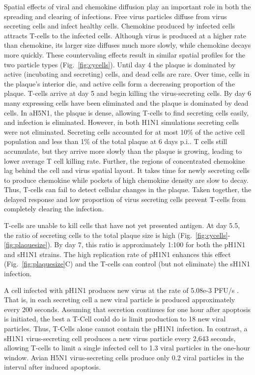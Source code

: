 \documentclass[10pt]{article}
\begin{document}
Spatial effects of viral and chemokine diffusion play an important role in both the spreading and clearing of infections.  Free virus particles diffuse from virus secreting cells and infect healthy cells.  Chemokine produced by infected cells attracts T-cells to the infected cells.  Although virus is produced at a higher rate than chemokine, its larger size diffuses much more slowly, while chemokine decays more quickly.  These countervaling effects result in similar spatial profiles for the two particle types (Fig.~\ref{fig:cycells}). Until day 4 the plaque is dominated by active (incubating and secreting) cells, and dead cells are rare. Over time, cells in the plaque's interior die, and active cells form a decreasing proportion of the plaque. T-cells arrive at day 5 and begin killing the virus-secreting cells. By day 6 many expressing cells have been eliminated and the plaque is dominated by dead cells.  In aH5N1, the plaque is dense, allowing T-cells to find secreting cells easily, and infection is eliminated.  However, in both H1N1 simulations secreting cells were not eliminated.  Secreting cells accounted for at most 10\% of the active cell population and less than 1\% of the total plaque at 6 days p.i..  T cells still accumulate, but they arrive more slowly than the plaque is growing, leading to lower average T cell killing rate.  Further, the regions of concentrated chemokine lag behind the cell and virus spatial layout.  It takes time for newly secreting cells to produce chemokine while pockets of high chemokine density are slow to decay.  Thus, T-cells can fail to detect cellular changes in the plaque.  Taken together, the delayed response and low proportion of virus secreting cells prevent T-cells from completely clearing the infection.

T-cells are unable to kill cells that have not yet presented antigen.  At day 5.5, the ratio of secreting cells to the total plaque size is high (Fig.~\ref{fig:cycells}-\ref{fig:plaquesize}). By day 7, this ratio is approximately 1:100 for both the pH1N1 and sH1N1 strains.  The high replication rate of pH1N1 enhances this effect (Fig.~\ref{fig:plaquesize}C) and the T-cells can control (but not eliminate) the sH1N1 infection.

A cell infected with pH1N1 produces new virus at the rate of 5.08e-3 PFU/s \cite{Mitchell2011}.  That is, in each secreting cell a new viral particle is produced approximately every 200 seconds.  Assuming that secretion continues for one hour after apoptosis is initiated, the best a T-Cell could do is limit production to 18 new viral particles.  Thus, T-Cells alone cannot contain the pH1N1 infection.  In contrast, a sH1N1 virus-secreting cell produces a new virus particle every 2,643 seconds, allowing T-cells to limit a single infected cell to 1.3 viral particles in the one-hour window.  Avian H5N1 virus-secreting cells produce only 0.2 viral particles in the interval after induced apoptosis. 
\end{document}

